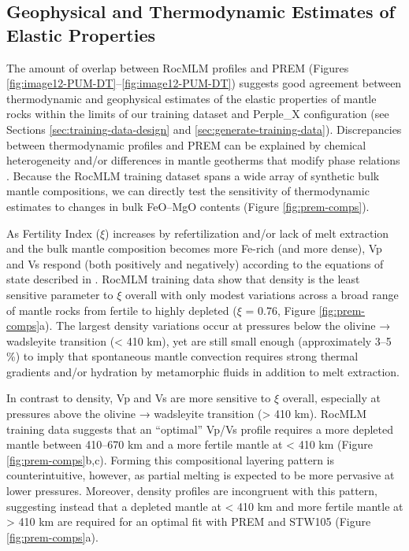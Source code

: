 \documentclass[draft,linenumbers]{agujournal2018}
\begin{document}
\subsection{Geophysical and Thermodynamic Estimates of Elastic Properties}\label{sec:rocmlm-elastic-properties}

The amount of overlap between RocMLM profiles and PREM (Figures \ref{fig:image12-PUM-DT}--\ref{fig:image12-PUM-DT}) suggests good agreement between thermodynamic and geophysical estimates of the elastic properties of mantle rocks within the limits of our training dataset and Perple\_X configuration (see Sections \ref{sec:training-data-design} and \ref{sec:generate-training-data}). Discrepancies between thermodynamic profiles and PREM can be explained by chemical heterogeneity and/or differences in mantle geotherms that modify phase relations \citep{goes2022, karki1999, karki2001, stixrude2012, waszek2021, xu2008}. Because the RocMLM training dataset spans a wide array of synthetic bulk mantle compositions, we can directly test the sensitivity of thermodynamic estimates to changes in bulk FeO--MgO contents (Figure \ref{fig:prem-comps}).

As Fertility Index (\(\xi\)) increases by refertilization and/or lack of melt extraction and the bulk mantle composition becomes more Fe-rich (and more dense), Vp and Vs respond (both positively and negatively) according to the equations of state described in \citet{stixrude2005}. RocMLM training data show that density is the least sensitive parameter to \(\xi\) overall with only modest variations across a broad range of mantle rocks from fertile to highly depleted (\(\xi\) = 0.76, Figure \ref{fig:prem-comps}a). The largest density variations occur at pressures below the olivine → wadsleyite transition (\textless{} 410 km), yet are still small enough (approximately 3--5 \%) to imply that spontaneous mantle convection requires strong thermal gradients and/or hydration by metamorphic fluids in addition to melt extraction.

In contrast to density, Vp and Vs are more sensitive to \(\xi\) overall, especially at pressures above the olivine → wadsleyite transition (\textgreater{} 410 km). RocMLM training data suggests that an ``optimal'' Vp/Vs profile requires a more depleted mantle between 410--670 km and a more fertile mantle at \textless{} 410 km (Figure \ref{fig:prem-comps}b,c). Forming this compositional layering pattern is counterintuitive, however, as partial melting is expected to be more pervasive at lower pressures. Moreover, density profiles are incongruent with this pattern, suggesting instead that a depleted mantle at \textless{} 410 km and more fertile mantle at \textgreater{} 410 km are required for an optimal fit with PREM and STW105 (Figure \ref{fig:prem-comps}a).
\end{document}
